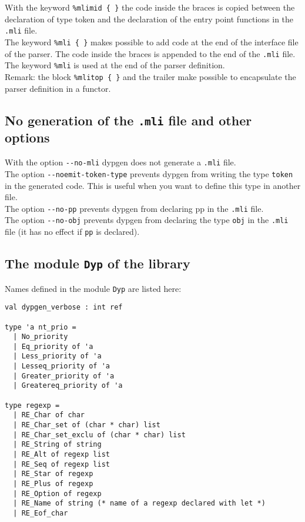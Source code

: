 \documentclass[12pt]{article}
\begin{document}
{With the keyword \verb|%mlimid { }| the code inside the braces is copied between the declaration of type token and the declaration of the entry point functions in the \verb|.mli| file.\\

The keyword \verb|%mli { }| makes possible to add code at the end of the interface file of the parser. The code inside the braces is appended to the end of the \texttt{.mli} file. The keyword \verb|%mli| is used at the end of the parser definition.\\

Remark: the block \verb|%mlitop { }| and the trailer make possible to encapsulate the parser definition in a functor.

\subsection{No generation of the \texttt{.mli} file and other options}

With the option \verb|--no-mli| dypgen does not generate a \verb|.mli| file.\\

The option \verb|--noemit-token-type| prevents dypgen from writing the type \verb|token| in the generated code. This is useful when you want to define this type in another file.\\

The option \verb|--no-pp| prevents dypgen from declaring pp in the \verb|.mli| file.\\

The option \verb|--no-obj| prevents dypgen from declaring the type \verb|obj| in the \verb|.mli| file (it has no effect if \verb|pp| is declared).

\subsection{The module \texttt{Dyp} of the library}
Names defined in the module \verb|Dyp| are listed here:
\begin{verbatim}
val dypgen_verbose : int ref

type 'a nt_prio =
  | No_priority
  | Eq_priority of 'a
  | Less_priority of 'a
  | Lesseq_priority of 'a
  | Greater_priority of 'a
  | Greatereq_priority of 'a

type regexp =
  | RE_Char of char
  | RE_Char_set of (char * char) list
  | RE_Char_set_exclu of (char * char) list
  | RE_String of string
  | RE_Alt of regexp list
  | RE_Seq of regexp list
  | RE_Star of regexp
  | RE_Plus of regexp
  | RE_Option of regexp
  | RE_Name of string (* name of a regexp declared with let *)
  | RE_Eof_char


\end{verbatim}}
\end{document}

